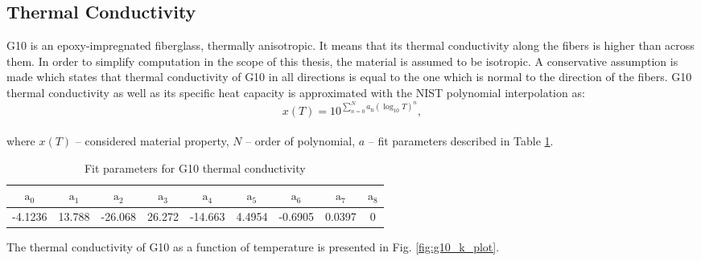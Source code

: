 
\subsection{Thermal Conductivity}
G10 is an epoxy-impregnated fiberglass, thermally anisotropic. It means that its thermal conductivity along the fibers is higher than across them. In order to simplify computation in the scope of this thesis, the material is assumed to be isotropic. A conservative assumption is made which states that thermal conductivity of G10 in all directions is equal to the one which is normal to the direction of the fibers.
G10 thermal conductivity as well as its specific heat capacity is approximated with the NIST polynomial interpolation as: 
\begin{equation}
    x(T) = 10^{\sum_{n=0}^{N} a_\text{n}(\log_\text{10}T)^{n}},
    \label{G10_polynomial_interpolation}
\end{equation}
\\
where $x(T)$ -- considered material property, $N$ -- order of polynomial, $a$ -- fit parameters described in Table \ref{table:nist_g10_k_parameters}.

\begin{table}[H]
    \caption{Fit parameters for G10 thermal conductivity} 
    \vspace{-1.em} 
    \fontsize{10}{10}
    \selectfont 
    \renewcommand{\arraystretch}{1.5}
    \begin{center}
    \begin{tabular}{ ccccccccc }  
    $\text{a}_0$ & $\text{a}_1$ & $\text{a}_2$ & $\text{a}_3$ & $\text{a}_4$ & $\text{a}_5$ & $\text{a}_6$ & $\text{a}_7$ & $\text{a}_8$ \\
    \hline
    -4.1236 & 13.788 & -26.068 & 26.272 & -14.663 & 4.4954 & -0.6905 & 0.0397 & 0 \\
    \hline 
    \end{tabular}
    \end{center}  
     \label{table:nist_g10_k_parameters} 
 \end{table}

The thermal conductivity of G10 as a function of temperature is presented in Fig. \ref{fig:g10_k_plot}.

